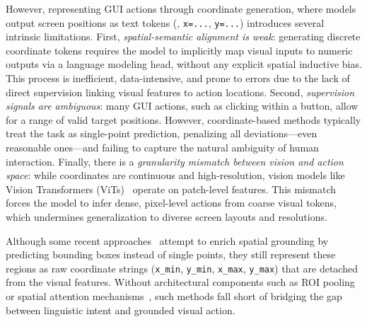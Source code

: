 However, representing GUI actions through coordinate generation, where models output screen positions as text tokens (\eg, \texttt{x=...}, \texttt{y=...}) introduces several intrinsic limitations. First, \textit{spatial-semantic alignment is weak}: generating discrete coordinate tokens requires the model to implicitly map visual inputs to numeric outputs via a language modeling head, without any explicit spatial inductive bias. This process is inefficient, data-intensive, and prone to errors due to the lack of direct supervision linking visual features to action locations. Second, \textit{supervision signals are ambiguous}: many GUI actions, such as clicking within a button, allow for a range of valid target positions. However, coordinate-based methods typically treat the task as single-point prediction, penalizing all deviations—even reasonable ones—and failing to capture the natural ambiguity of human interaction. Finally, there is a \textit{granularity mismatch between vision and action space}: while coordinates are continuous and high-resolution, vision models like Vision Transformers (ViTs)~\cite{dosovitskiy2021an} operate on patch-level features. This mismatch forces the model to infer dense, pixel-level actions from coarse visual tokens, which undermines generalization to diverse screen layouts and resolutions.

Although some recent approaches~\cite{qin2025ui} attempt to enrich spatial grounding by predicting bounding boxes instead of single points, they still represent these regions as raw coordinate strings (\eg \texttt{x\_min}, \texttt{y\_min}, \texttt{x\_max}, \texttt{y\_max}) that are detached from the visual features. Without architectural components such as ROI pooling~\cite{sun2019roi} or spatial attention mechanisms~\cite{zhu2019empirical}, such methods fall short of bridging the gap between linguistic intent and grounded visual action. %


